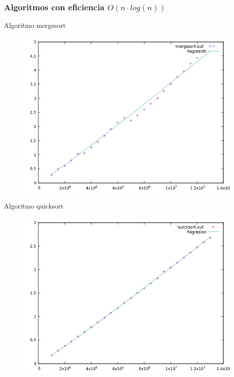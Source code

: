 \documentclass{beamer}
\begin{document}
\subsubsection{Algoritmos con eficiencia $O(n \cdot log(n))$}

\begin{frame}[fragile]{Algoritmo mergesort}
\begin{figure}[H]
\centering
\includegraphics[scale=0.5]{hibrida_mergesort.png}
\end{figure}
\end{frame}

\begin{frame}[fragile]{Algoritmo quicksort}
\begin{figure}[H]
\centering
\includegraphics[scale=0.5]{hibrida_quicksort.png}
\end{figure}
\end{frame}
\end{document}
